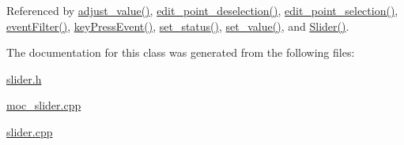 Referenced by \hyperlink{a00046_source_l00069}{adjust\+\_\+value()}, \hyperlink{a00046_source_l00063}{edit\+\_\+point\+\_\+deselection()}, \hyperlink{a00046_source_l00057}{edit\+\_\+point\+\_\+selection()}, \hyperlink{a00046_source_l00251}{event\+Filter()}, \hyperlink{a00046_source_l00219}{key\+Press\+Event()}, \hyperlink{a00046_source_l00379}{set\+\_\+status()}, \hyperlink{a00046_source_l00102}{set\+\_\+value()}, and \hyperlink{a00046_source_l00014}{Slider()}.



The documentation for this class was generated from the following files\+:\begin{DoxyCompactItemize}
\item 
\hyperlink{a00025}{slider.\+h}\item 
\hyperlink{a00019}{moc\+\_\+slider.\+cpp}\item 
\hyperlink{a00046}{slider.\+cpp}\end{DoxyCompactItemize}
